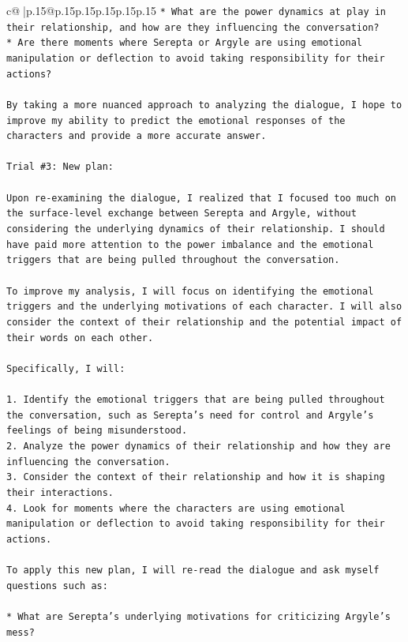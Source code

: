 \documentclass{article}
\begin{document}
{\begin{supertabular}{c@{$\;$}|p{.15\linewidth}@{}p{.15\linewidth}p{.15\linewidth}p{.15\linewidth}p{.15\linewidth}p{.15\linewidth}}
{{{\texttt{* What are the power dynamics at play in their relationship, and how are they influencing the conversation?} \\
\texttt{* Are there moments where Serepta or Argyle are using emotional manipulation or deflection to avoid taking responsibility for their actions?} \\
\\ 
\texttt{By taking a more nuanced approach to analyzing the dialogue, I hope to improve my ability to predict the emotional responses of the characters and provide a more accurate answer.} \\
\\ 
\texttt{Trial \#3: New plan: } \\
\\ 
\texttt{Upon re{-}examining the dialogue, I realized that I focused too much on the surface{-}level exchange between Serepta and Argyle, without considering the underlying dynamics of their relationship. I should have paid more attention to the power imbalance and the emotional triggers that are being pulled throughout the conversation.} \\
\\ 
\texttt{To improve my analysis, I will focus on identifying the emotional triggers and the underlying motivations of each character. I will also consider the context of their relationship and the potential impact of their words on each other.} \\
\\ 
\texttt{Specifically, I will:} \\
\\ 
\texttt{1. Identify the emotional triggers that are being pulled throughout the conversation, such as Serepta's need for control and Argyle's feelings of being misunderstood.} \\
\texttt{2. Analyze the power dynamics of their relationship and how they are influencing the conversation.} \\
\texttt{3. Consider the context of their relationship and how it is shaping their interactions.} \\
\texttt{4. Look for moments where the characters are using emotional manipulation or deflection to avoid taking responsibility for their actions.} \\
\\ 
\texttt{To apply this new plan, I will re{-}read the dialogue and ask myself questions such as:} \\
\\ 
\texttt{* What are Serepta's underlying motivations for criticizing Argyle's mess?} \\
}}}
\end{supertabular}}
\end{document}

